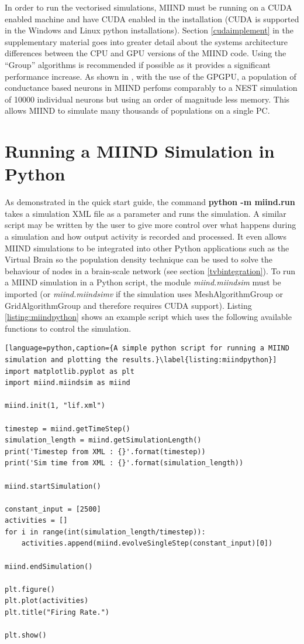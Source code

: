 \documentclass[utf8]{frontiersSCNS} %
\begin{document}
In order to run the vectorised simulations, MIIND must be running on a CUDA enabled machine and have CUDA enabled in the installation (CUDA is supported in the Windows and Linux python installations). Section \ref{cudaimplement} in the supplementary material goes into greater detail about the systems architecture differences between the CPU and GPU versions of the MIIND code. Using the ``Group'' algorithms is recommended if possible as it provides a significant performance increase. As shown in \cite{de2019computational}, with the use of the GPGPU, a population of conductance based neurons in MIIND perfoms comparably to a NEST simulation of 10000 individual neurons but using an order of magnitude less memory. This allows MIIND to simulate many thousands of populations on a single PC.

\section{Running a MIIND Simulation in Python}
\label{miindpython}
As demonstrated in the quick start guide, the command \textbf{python -m miind.run} takes a simulation XML file as a parameter and runs the simulation. A similar script may be written by the user to give more control over what happens during a simulation and how output activity is recorded and processed. It even allows MIIND simulations to be integrated into other Python applications such as the Virtual Brain \citep{sanz2013virtual} so the population density technique can be used to solve the behaviour of nodes in a brain-scale network (see section \ref{tvbintegration}). To run a MIIND simulation in a Python script, the module \textit{miind.miindsim} must be imported (or \textit{miind.miindsimv} if the simulation uses MeshAlgorithmGroup or GridAlgorithmGroup and therefore requires CUDA support). Listing \ref{listing:miindpython} shows an example script which uses the following available functions to control the simulation.

\begin{lstlisting}[language=python,caption={A simple python script for running a MIIND simulation and plotting the results.}\label{listing:miindpython}]
import matplotlib.pyplot as plt
import miind.miindsim as miind

miind.init(1, "lif.xml")

timestep = miind.getTimeStep()
simulation_length = miind.getSimulationLength()
print('Timestep from XML : {}'.format(timestep))
print('Sim time from XML : {}'.format(simulation_length))

miind.startSimulation()

constant_input = [2500]
activities = []
for i in range(int(simulation_length/timestep)):
    activities.append(miind.evolveSingleStep(constant_input)[0])

miind.endSimulation()

plt.figure()
plt.plot(activities)
plt.title("Firing Rate.")

plt.show()
\end{lstlisting}
\end{document}
